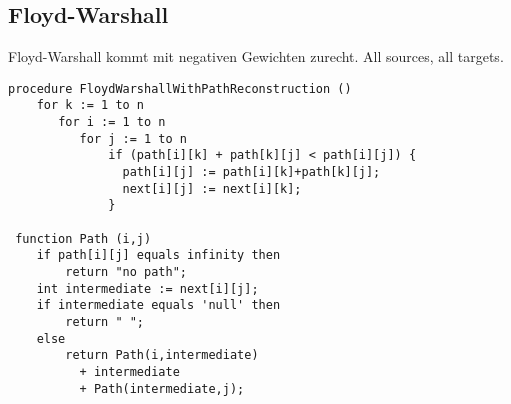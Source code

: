 \subsection{Floyd-Warshall}
Floyd-Warshall kommt mit negativen Gewichten zurecht. All sources, all targets.
\begin{lstlisting}
procedure FloydWarshallWithPathReconstruction ()
    for k := 1 to n
       for i := 1 to n
          for j := 1 to n
              if (path[i][k] + path[k][j] < path[i][j]) {
                path[i][j] := path[i][k]+path[k][j];
                next[i][j] := next[i][k]; 
              }

 function Path (i,j)
    if path[i][j] equals infinity then
        return "no path";
    int intermediate := next[i][j];
    if intermediate equals 'null' then
        return " ";
    else
        return Path(i,intermediate) 
          + intermediate 
          + Path(intermediate,j);
\end{lstlisting}
